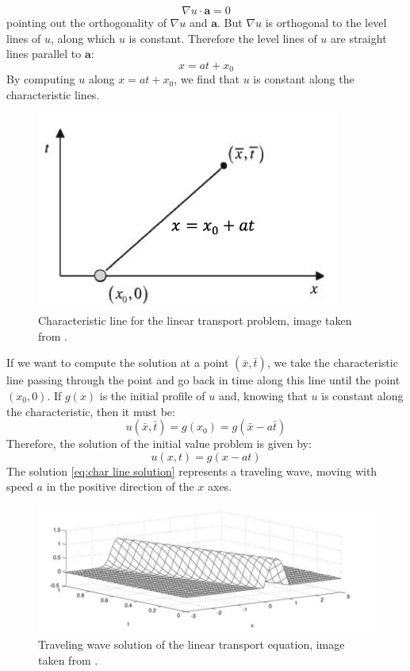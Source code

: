 \documentclass[12pt,a4paper]{article}
\numberwithin{equation}{section}
\begin{document}
\begin{equation}
\nabla u \cdot \boldsymbol{a} = 0
\end{equation}
pointing out the orthogonality of $\nabla u$ and $\boldsymbol{a}$. But $\nabla u$ is orthogonal to the level lines of $u$, along which $u$ is constant. Therefore the level lines of $u$ are straight lines parallel to  $\boldsymbol{a}$:
\begin{equation*}
x = at+x_0
\end{equation*}
By computing $u$ along $x = at+x_0$, we find that $u$ is constant along the characteristic lines.\\
\begin{figure}[H]
  \centering
    \includegraphics[width=10cm]{char_method.jpg}
    \caption{Characteristic line for the linear transport problem, image taken from \cite{salsa}.}
\end{figure}
If we want to compute the solution at a point $(\bar{x}, \bar{t})$, we take the characteristic line passing through the point and go back in time along this line until the point $(x_0,0)$. If $g(x)$ is the initial profile of $u$ and, knowing that $u$ is constant along the characteristic, then it must be:
\begin{equation*}
u(\bar{x}, \bar{t}) = g(x_0) = g(\bar{x} -a\bar{t})
\end{equation*}
Therefore, the solution of the initial value problem is given by:
\begin{equation} \label{eq:char line solution}
u(x,t) = g(x-at)
\end{equation}
The solution \ref{eq:char line solution} represents a traveling wave, moving with speed $a$ in the positive direction of the $x$ axes.
\begin{figure}[H]
  \centering
    \includegraphics[width=12cm]{Traveling_wave_solution.jpg}
    \caption{Traveling wave solution of the linear transport equation, image taken from \cite{salsa}.}
\end{figure}
\end{document}
